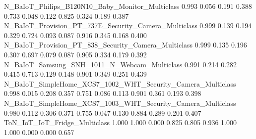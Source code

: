 N_BaIoT_Philips_B120N10_Baby_Monitor_Multiclass                            0.993            0.056                                    0.191                           0.388           0.733                    0.048                                                     0.122                                     0.825                                     0.324                              0.189   0.387
N_BaIoT_Provision_PT_737E_Security_Camera_Multiclass                       0.999            0.139                                    0.194                           0.329           0.724                    0.093                                                     0.087                                     0.916                                     0.345                              0.168   0.400
N_BaIoT_Provision_PT_838_Security_Camera_Multiclass                        0.999            0.135                                    0.196                           0.307           0.697                    0.079                                                     0.087                                     0.905                                     0.334                              0.179   0.392
N_BaIoT_Samsung_SNH_1011_N_Webcam_Multiclass                               0.991            0.214                                    0.282                           0.415           0.713                    0.129                                                     0.148                                     0.901                                     0.349                              0.251   0.439
N_BaIoT_SimpleHome_XCS7_1002_WHT_Security_Camera_Multiclass                0.998            0.015                                    0.208                           0.357           0.751                    0.086                                                     0.113                                     0.901                                     0.361                              0.193   0.398
N_BaIoT_SimpleHome_XCS7_1003_WHT_Security_Camera_Multiclass                0.980            0.112                                    0.306                           0.371           0.755                    0.047                                                     0.130                                     0.884                                     0.289                              0.201   0.407
ToN_IoT_IoT_Fridge_Multiclass                                              1.000            1.000                                    0.000                           0.825           0.805                    0.936                                                     1.000                                     1.000                                     0.000                              0.000   0.657
